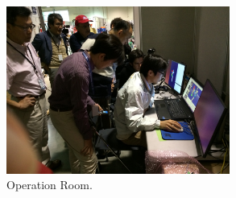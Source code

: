 		\begin{figure}[b]
			\centering
			\includegraphics[height = 5.5cm]{img/OperationRoom}
			\caption{Operation Room.}
			\label{fig:OperationRoom}
		\end{figure}